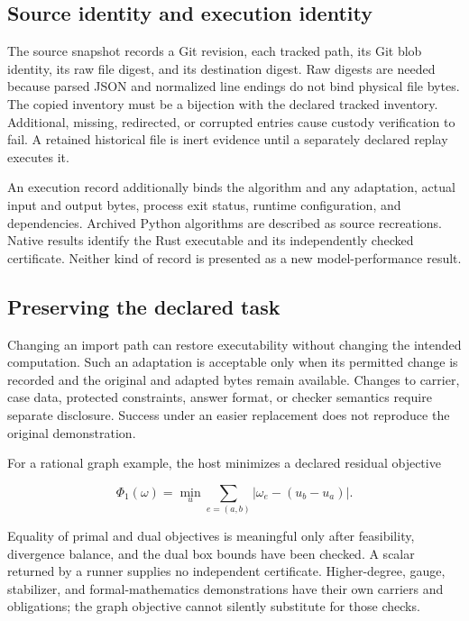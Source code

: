\documentclass[
  11pt,
]{article}
\begin{document}
\subsection{Source identity and execution
identity}\label{source-identity-and-execution-identity}

The source snapshot records a Git revision, each tracked path, its Git
blob identity, its raw file digest, and its destination digest. Raw
digests are needed because parsed JSON and normalized line endings do
not bind physical file bytes. The copied inventory must be a bijection
with the declared tracked inventory. Additional, missing, redirected, or
corrupted entries cause custody verification to fail. A retained
historical file is inert evidence until a separately declared replay
executes it.

An execution record additionally binds the algorithm and any adaptation,
actual input and output bytes, process exit status, runtime
configuration, and dependencies. Archived Python algorithms are
described as source recreations. Native results identify the Rust
executable and its independently checked certificate. Neither kind of
record is presented as a new model-performance result.

\subsection{Preserving the declared
task}\label{preserving-the-declared-task}

Changing an import path can restore executability without changing the
intended computation. Such an adaptation is acceptable only when its
permitted change is recorded and the original and adapted bytes remain
available. Changes to carrier, case data, protected constraints, answer
format, or checker semantics require separate disclosure. Success under
an easier replacement does not reproduce the original demonstration.

For a rational graph example, the host minimizes a declared residual
objective

\[
\Phi_1(\omega)=\min_u\sum_{e=(a,b)}
\left|\omega_e-(u_b-u_a)\right|.
\]

Equality of primal and dual objectives is meaningful only after
feasibility, divergence balance, and the dual box bounds have been
checked. A scalar returned by a runner supplies no independent
certificate. Higher-degree, gauge, stabilizer, and formal-mathematics
demonstrations have their own carriers and obligations; the graph
objective cannot silently substitute for those checks.
\end{document}
